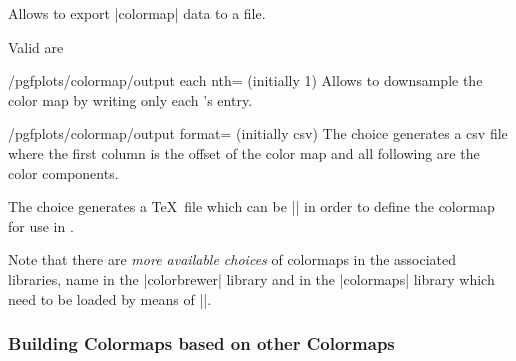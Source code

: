 \begin{command}{\pgfplotscolormaptodatafile{}}
	Allows to export |colormap| data to a file.
\begin{codeexample}[]
\end{codeexample}

\begin{codeexample}[]
\end{codeexample}
	
	Valid  are
	\begin{pgfplotskey}{/pgfplots/colormap/output each nth= (initially 1)}
		Allows to downsample the color map by writing only each 's entry.
	\end{pgfplotskey}
	\begin{pgfplotskey}{/pgfplots/colormap/output format= (initially csv)}
		The choice  generates a csv file where the first column is the offset of the color map and all following are the color components.

		The choice  generates a \TeX\ file which can be || in order to define the colormap for use in \PGFPlots.
	\end{pgfplotskey}
\end{command}


Note that there are \emph{more available choices} of colormaps in the associated libraries, name in the |colorbrewer| library and in the |colormaps| library which need to be loaded by means of ||.

\subsubsection{Building Colormaps based on other Colormaps}
\label{sec:pgfplots:colormaps:based:on:others}

